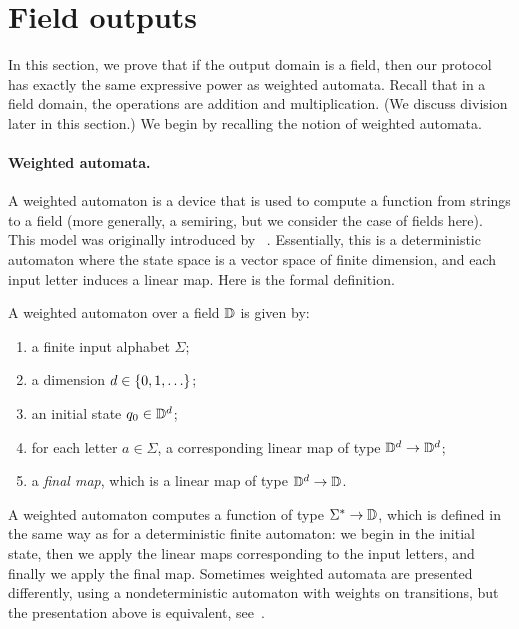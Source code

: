 \section{Field outputs}
\label{sec:field-domain}
In this section, we prove that if the output domain is a field, then our protocol has exactly the same expressive power as weighted automata.
Recall that in a field domain, the operations are addition and multiplication. (We discuss division later in this section.)
We begin by recalling the notion of weighted automata.

\paragraph*{Weighted automata.}  A weighted automaton is a device that is used to compute a function from strings to a field (more generally, a semiring, but we consider the case of fields here). This model was originally introduced by \schutz~\cite{schutzenberger1961definition}. Essentially, this is a deterministic automaton where the state space is a vector space of finite dimension, and each input letter induces a linear map. Here is the formal definition. 

\begin{definition}
    \label{def:weighted-automaton}
    A weighted automaton over a field $\mathbb D$ is given by: 
    \begin{enumerate}
        \item a finite input alphabet $\Sigma$;
        \item a dimension $d \in \{0,1,\ldots\}$;
        \item an initial state $q_0 \in \mathbb D^d$;
        \item for each letter $a \in \Sigma$, a corresponding linear map of type $\mathbb D^d \to \mathbb D^d$;
        \item a \emph{final map}, which is a linear map of type $\mathbb D^d \to \mathbb D$. 
    \end{enumerate}
\end{definition}

A weighted automaton computes a function of type $\Sigma^* \to \mathbb D$, which is defined in the same way as for a deterministic finite automaton: we begin in the initial state, then we apply the linear maps corresponding to the input letters, and finally we apply the final map.
Sometimes weighted automata are presented differently, using a nondeterministic automaton with weights on transitions, but the presentation above is equivalent, see~\cite[Lemma 4.3]{bojanczyk_automata_2025}.

